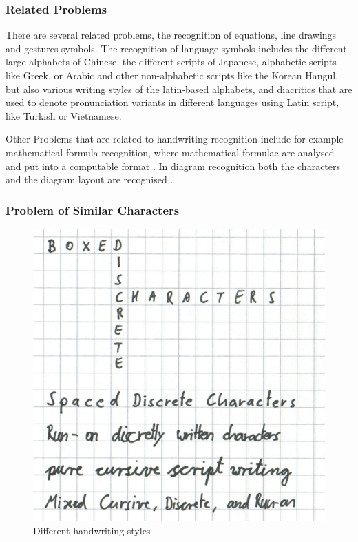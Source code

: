 \subsubsection{Related Problems}
\label{sec:relatedproblems}

There are several related problems, the recognition of equations, line 
drawings and gestures symbols. The recognition of language symbols includes 
the different large alphabets of Chinese, the different scripts of Japanese, 
alphabetic scripts like Greek, or Arabic and other non-alphabetic scripts like
the Korean  Hangul, but also various writing styles of the latin-based 
alphabets, and diacritics that are used to denote pronunciation variants in 
different languages using Latin script, like Turkish or Vietnamese.

Other Problems that are related to handwriting recognition include for example
mathematical formula recognition, where mathematical formulae are analysed and 
put into a computable format . In diagram recognition 
both the characters and the diagram layout are recognised 
.

\subsubsection{Problem of Similar Characters}
\label{sec:similarcharacters}

\begin{figure}[htbp]
\begin{center}
\includegraphics[scale=0.3]{images/differentHandwritingStylesSelfmade.png}
\caption{Different handwriting styles}
\label{fig:differenthandwritingstyles}
\end{center}
\end{figure}

